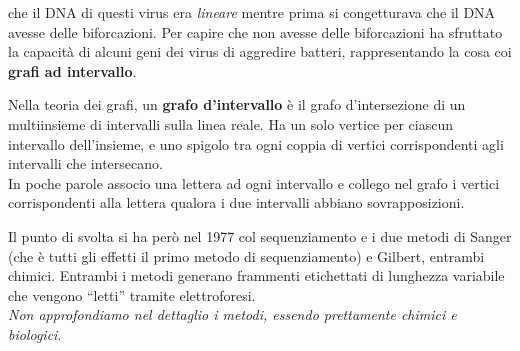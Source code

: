 \documentclass[a4paper,12pt, oneside]{book}
\begin{document}
che il DNA di questi virus era \textit{lineare} mentre prima si congetturava che
il DNA avesse delle biforcazioni. Per capire che non avesse delle biforcazioni
ha sfruttato la capacità di alcuni geni dei virus di aggredire batteri,
rappresentando la cosa coi \textbf{grafi ad intervallo}.
\begin{definizione}
  Nella teoria dei grafi, un \textbf{grafo d'intervallo} è il grafo
  d'intersezione di un 
  multiinsieme di intervalli sulla linea reale. Ha un solo vertice per ciascun
  intervallo dell'insieme, e uno spigolo tra ogni coppia di vertici
  corrispondenti agli intervalli che
  intersecano.\\
  In poche parole associo una lettera ad ogni intervallo e collego nel grafo i
  vertici corrispondenti alla lettera qualora i due intervalli abbiano
  sovrapposizioni.
\end{definizione}
Il punto di svolta si ha però nel 1977 col sequenziamento e i due metodi di
Sanger (che è tutti gli effetti il primo metodo di sequenziamento) e Gilbert,
entrambi chimici. Entrambi i metodi generano frammenti etichettati di lunghezza
variabile che vengono ``letti'' tramite elettroforesi. \\
\textit{Non approfondiamo nel dettaglio i metodi, essendo prettamente chimici e
  biologici}.
\end{document}

